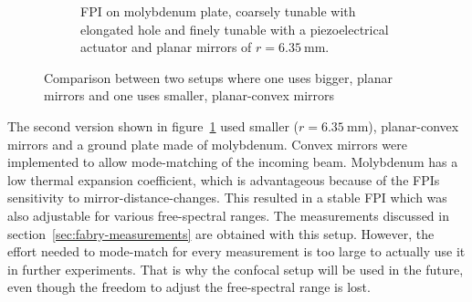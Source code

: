 \begin{figure}[H]
\begin{subfigure}[b]{0.48\textwidth}
		\caption{FPI on molybdenum plate, coarsely tunable with elongated hole and finely tunable with a piezoelectrical actuator and planar mirrors of $r=\SI{6.35}{\milli \meter}$.}
		\label{fig:new}
	\end{subfigure}
	\caption{Comparison between two setups where one uses bigger, planar mirrors and one uses smaller, planar-convex mirrors}
	\label{fig:old-new-fpi}
\end{figure}


The second version shown in figure~\ref{fig:new} used smaller ($r=\SI{6.35}{\milli \meter}$), planar-convex mirrors and a ground plate made of molybdenum.
Convex mirrors were implemented to allow mode-matching of the incoming beam.
Molybdenum has a low thermal expansion coefficient, which is advantageous because of the \acp{FPI} sensitivity to mirror-distance-changes. 
This resulted in a stable \ac{FPI} which was also adjustable for various free-spectral ranges.
The measurements discussed in section~\ref{sec:fabry-measurements} are obtained with this setup.
However, the effort needed to mode-match for every measurement is too large to actually use it in further experiments.
That is why the confocal setup will be used in the future, even though the freedom to adjust the free-spectral range is lost.


